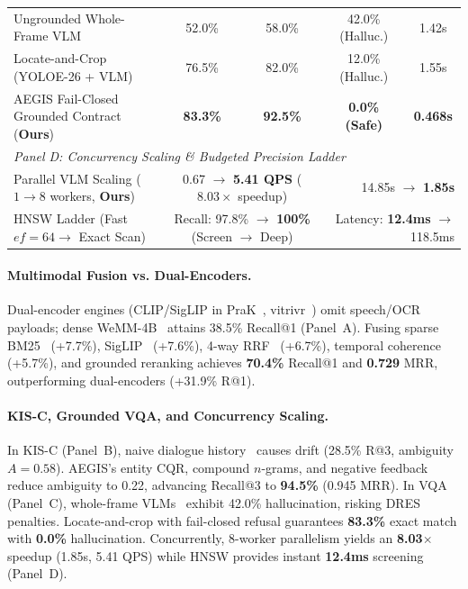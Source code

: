 \documentclass[runningheads,a4paper]{llncs}
\begin{document}
\begin{table}[t]
{\begin{tabular}{lcccc}
Ungrounded Whole-Frame VLM~\cite{tran2026niiuit} & 52.0\% & 58.0\% & 42.0\% (Halluc.) & 1.42s \\
Locate-and-Crop (YOLOE-26 + VLM) & 76.5\% & 82.0\% & 12.0\% (Halluc.) & 1.55s \\
AEGIS Fail-Closed Grounded Contract (\textbf{Ours}) & \textbf{83.3\%} & \textbf{92.5\%} & \textbf{0.0\% (Safe)} & \textbf{0.468s} \\
\midrule
\multicolumn{5}{l}{\emph{Panel D: Concurrency Scaling \& Budgeted Precision Ladder}} \\
Parallel VLM Scaling ($1 \to 8$ workers, \textbf{Ours}) & \multicolumn{2}{c}{0.67 $\to$ \textbf{5.41 QPS} ($8.03\times$ speedup)} & \multicolumn{2}{r}{14.85s $\to$ \textbf{1.85s}} \\
HNSW Ladder (Fast $ef{=}64 \to$ Exact Scan) & \multicolumn{2}{c}{Recall: 97.8\% $\to$ \textbf{100\%} (Screen $\to$ Deep)} & \multicolumn{2}{r}{Latency: \textbf{12.4ms} $\to$ 118.5ms} \\
\bottomrule
\end{tabular}%
}
\vspace{-4mm}
\end{table}

\paragraph{Multimodal Fusion vs. Dual-Encoders.}
Dual-encoder engines (CLIP/SigLIP in PraK~\cite{jackl2026prak}, vitrivr~\cite{rossetto2021vitrivr}) omit speech/OCR payloads; dense WeMM-4B~\cite{wemm2025} attains 38.5\% Recall@1 (Panel~A). Fusing sparse BM25~\cite{le2025fustar} (+7.7\%), SigLIP~\cite{zhai2023sigmoid} (+7.6\%), 4-way RRF~\cite{cormack2009reciprocal} (+6.7\%), temporal coherence (+5.7\%), and grounded reranking achieves \textbf{70.4\%} Recall@1 and \textbf{0.729} MRR, outperforming dual-encoders (+31.9\% R@1).

\paragraph{KIS-C, Grounded VQA, and Concurrency Scaling.}
In KIS-C (Panel~B), naive dialogue history~\cite{sekulic2021evaluating} causes drift (28.5\% R@3, ambiguity $A=0.58$). AEGIS's entity CQR, compound $n$-grams, and negative feedback reduce ambiguity to 0.22, advancing Recall@3 to \textbf{94.5\%} (0.945 MRR). In VQA (Panel~C), whole-frame VLMs~\cite{tran2026niiuit} exhibit 42.0\% hallucination, risking DRES penalties. Locate-and-crop with fail-closed refusal guarantees \textbf{83.3\%} exact match with \textbf{0.0\%} hallucination. Concurrently, 8-worker parallelism yields an \textbf{8.03$\times$} speedup (1.85s, 5.41 QPS) while HNSW provides instant \textbf{12.4ms} screening (Panel~D).
\end{document}
